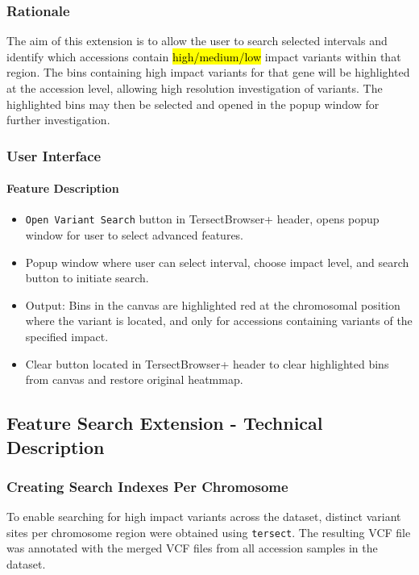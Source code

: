 \documentclass[12pt]{article}
\begin{document}
\subsubsection{Rationale}
The aim of this extension is to allow the user to search selected intervals and identify which accessions contain \hl{high/medium/low} impact variants within that region. The bins containing high impact variants for that gene will be highlighted at the accession level, allowing high resolution investigation of variants. The highlighted bins may then be selected and opened in the popup  window for further investigation.

\subsubsection{User Interface}
\paragraph{Feature Description}
\begin{itemize}
    \item \verb+Open Variant Search+ button in TersectBrowser+ header, opens popup window for user to select advanced features.
    \item Popup window where user can select interval, choose impact level, and search button to initiate search.
    \item Output: Bins in the canvas are highlighted red at the chromosomal position where the variant is located, and only for accessions containing variants of the specified impact.
    \item Clear button located in TersectBrowser+ header to clear highlighted bins from canvas and restore original heatmmap.
\end{itemize}

\subsection{Feature Search Extension - Technical Description}

\subsubsection{Creating Search Indexes Per Chromosome}

To enable searching for high impact variants across the dataset, distinct variant sites per chromosome region were obtained using \texttt{tersect}. The resulting VCF file was annotated with the merged VCF files from all accession samples in the dataset.
\end{document}
